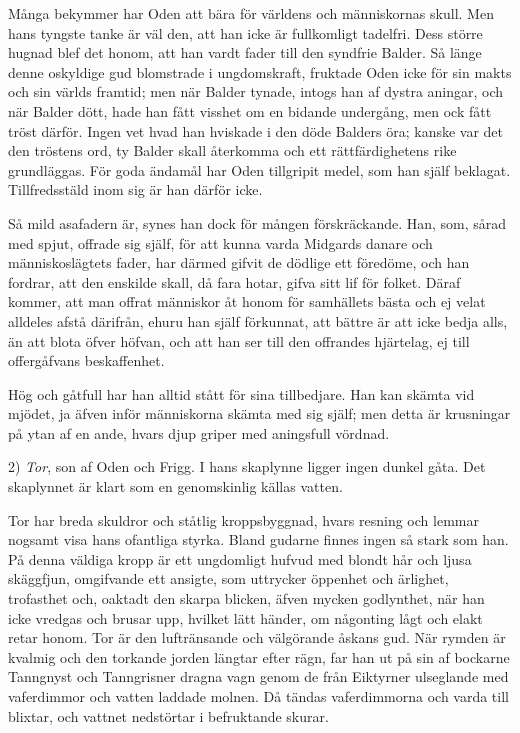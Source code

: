 Många bekymmer har Oden att bära för världens och människornas skull.
Men hans tyngste tanke är väl den, att han icke är fullkomligt tadelfri.
Dess större hugnad blef det honom, att han vardt fader till den syndfrie
Balder. Så länge denne oskyldige gud blomstrade i ungdomskraft, fruktade
Oden icke för sin makts och sin världs framtid; men när Balder tynade,
intogs han af dystra aningar, och när Balder dött, hade han fått visshet
om en bidande undergång, men ock fått tröst därför. Ingen vet hvad han
hviskade i den döde Balders öra; kanske var det den tröstens ord, ty
Balder skall återkomma och ett rättfärdighetens rike grundläggas. För
goda ändamål har Oden tillgripit medel, som han själf beklagat.
Tillfredsstäld inom sig är han därför icke.

Så mild asafadern är, synes han dock för mången förskräckande. Han, som,
sårad med spjut, offrade sig själf, för att kunna varda Midgards danare
och människoslägtets fader, har därmed gifvit de dödlige ett föredöme,
och han fordrar, att den enskilde skall, då fara hotar, gifva sitt lif
för folket. Däraf kommer, att man offrat människor åt honom för
samhällets bästa och ej velat alldeles afstå därifrån, ehuru han själf
förkunnat, att bättre är att icke bedja alls, än att blota öfver höfvan,
och att han ser till den offrandes hjärtelag, ej till offergåfvans
beskaffenhet.

Hög och gåtfull har han alltid stått för sina tillbedjare. Han kan
skämta vid mjödet, ja äfven inför människorna skämta med sig själf; men
detta är krusningar på ytan af en ande, hvars djup griper med aningsfull
vördnad.

2) \emph{Tor}, son af Oden och Frigg. I hans skaplynne ligger ingen
dunkel gåta. Det skaplynnet är klart som en genomskinlig källas vatten.

\protect\hypertarget{lb1625905.xhtmlux5cux23start28}{}{}\protect\hypertarget{lb1625905.xhtmlux5cux23start28-a}{}{}\protect\hypertarget{lb1625905.xhtmlux5cux23start28-b}{}{}\protect\hypertarget{lb1625905.xhtmlux5cux23start28-c}{}{}\protect\hypertarget{lb1625905.xhtmlux5cux23start28-d}{}{}

Tor har breda skuldror och ståtlig kroppsbyggnad, hvars resning och
lemmar nogsamt visa hans ofantliga styrka. Bland gudarne finnes ingen så
stark som han. På denna väldiga kropp är ett ungdomligt hufvud med
blondt hår och ljusa skäggfjun, omgifvande ett ansigte, som uttrycker
öppenhet och ärlighet, trofasthet och, oaktadt den skarpa blicken, äfven
mycken godlynthet, när han icke vredgas och brusar upp, hvilket lätt
händer, om någonting lågt och elakt retar honom. Tor är den luftränsande
och välgörande åskans gud. När rymden är kvalmig och den torkande jorden
längtar efter rägn, far han ut på sin af bockarne Tanngnyst och
Tanngrisner dragna vagn genom de från Eiktyrner ulseglande med
vaferdimmor och vatten laddade molnen. Då tändas vaferdimmorna och varda
till blixtar, och vattnet nedstörtar i befruktande skurar.

